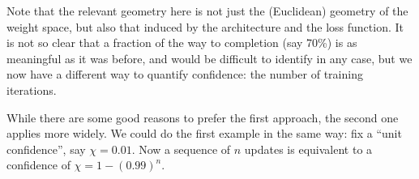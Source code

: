 Note that the relevant geometry here is not just the (Euclidean) geometry of the weight space, but also that induced by the architecture and the loss function.
It is not so clear that a fraction of the way to completion (say 70\%) is as meaningful as it was before, and would be difficult to identify in any case,
but we now have a different way to quantify confidence: the number of training iterations. 

While there are some good reasons to prefer the first approach, 
the second one applies more widely. 
We could do the first example in the same way: fix a ``unit confidence'', say $\chi=0.01$. Now a sequence of $n$ updates is equivalent to a confidence of $\chi= 1-(0.99)^n$. 










